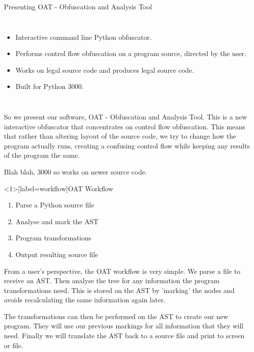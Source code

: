 \begin{frame}{Presenting OAT - Obfuscation and Analysis Tool}
\begin{columns}
\begin{itemize}
\item Interactive command line Python obfuscator.
\item Performs control flow obfuscation on a program source, directed by the user.
\item Works on legal source code and produces legal source code.
\item Built for Python 3000.
\end{itemize}
\end{columns}
\end{frame}

So we present our software, OAT - Obfuscation and Analysis Tool. This is a new interactive obfuscator that concentrates on control flow obfuscation.
This means that rather than altering layout of the source code, we try to change how the program actually runs, creating a confusing control flow while
keeping any results of the program the same.

Blah blah, 3000 so works on newer source code.

\begin{frame}<1>[label=workflow]{OAT Workflow}
\begin{enumerate}
\item Parse a Python source file 
\item Analyse and mark the AST 
\item Program transformations
\item Output resulting source file 
\end{enumerate}
\end{frame}

From a user's perspective, the OAT workflow is very simple. We parse a file to receive an AST. Then analyse the tree for any information the program
transformations need. This is stored on the AST by 'marking' the nodes and avoids recalculating the same information again later.

The transformations can then be performed on the AST to create our new program. They will use our previous markings for all information that they will need.
Finally we will translate the AST back to a source file and print to screen or file.


